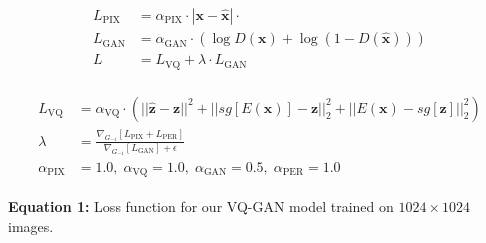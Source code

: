 \documentclass[14pt,margin=0.5in,innermargin=0in,blockverticalspace=-0.1in,colspace=-1.0cm]{tikzposter}
\begin{document}
\begin{columns}
{\begin{tcolorbox}[boxsep=0pt,top=0cm,adjusted title={\Large\bf Proposed Method},colbacktitle=colorOne]
        \begin{minipage}{0.40\linewidth}
            \begin{align*}
            \begin{split}
                L_\text{PIX} &= \alpha_\text{PIX} \cdot |\mathbf{x} -
                \hat{\mathbf{x}}| \cdot \\
                L_\text{GAN} &= \alpha_\text{GAN} \cdot \left(\log D(\mathbf{x}) + \log
                (1-D(\hat{\mathbf{x}}))\right) \\
                L &= L_\text{VQ} + \lambda \cdot L_\text{GAN}
            \end{split}
            \end{align*}
        \end{minipage}
        \begin{minipage}{0.59\linewidth}
            \begin{align*}
            \begin{split}
                L_\text{VQ} &= \alpha_\text{VQ} \cdot \left(||\hat{\mathbf{z}} -
                \mathbf{z}||^2 + ||sg[E(\mathbf{x})] - \mathbf{z}||^2_2 +
                ||E(\mathbf{x}) -
                sg[\mathbf{z}]||^2_2\right)\\
                \lambda &= \frac{\nabla_{G_{-1}}[L_\text{PIX} +
                L_\text{PER}]}{\nabla_{G_{-1}}[L_\text{GAN}] + \epsilon}\\
                \alpha_\text{PIX} &= 1.0,\; \alpha_\text{VQ} = 1.0,\; \alpha_\text{GAN} = 0.5,\; \alpha_\text{PER} = 1.0
            \end{split}
            \end{align*}
        \end{minipage}
        \vspace{0.4cm}

        \textbf{Equation 1:} Loss function for our VQ-GAN model trained on $1024
        \times 1024$ images.
        \vspace{0.3cm}


\end{tcolorbox}}
\end{columns}
\end{document}

